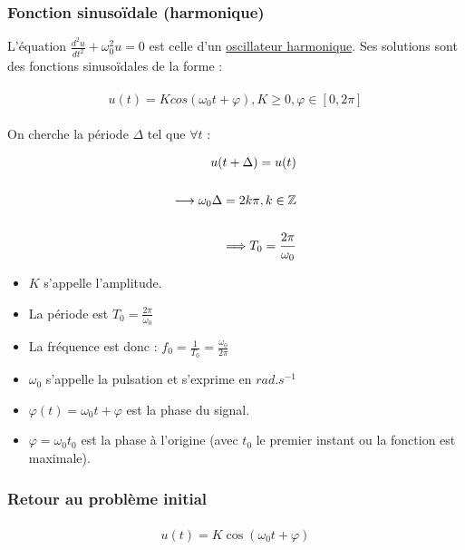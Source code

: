\documentclass{article}
\begin{document}
\subsubsection{Fonction sinusoïdale (harmonique)}

L'équation $\frac{d^2u}{dt^2}+\omega_0^2u=0$ est celle d'un \underline{oscillateur harmonique}. Ses solutions sont des fonctions sinusoïdales de la forme :

\begin{align*}\begin{split}
u(t)=Kcos(\omega_0t+\varphi), K\ge0, \varphi\in[0, 2\pi]
\end{split}\end{align*}

On cherche la période $\Delta$ tel que $\forall t$ :

\begin{align*}\begin{split}
u(t+\Delta)=u(t)\\\\
\longrightarrow \omega_0\Delta = 2k\pi, k\in\mathbb{Z}\\\\
\Longrightarrow T_0=\frac{2\pi}{\omega_0}
\end{split}\end{align*}

\begin{itemize}
    \item $K$ s'appelle l'amplitude.
    \item La période est $\boxed{T_0=\frac{2\pi}{\omega_0}}$
    \item La fréquence est donc : $\boxed{f_0=\frac{1}{T_0}=\frac{\omega_0}{2\pi}}$
    \item $\omega_0$ s'appelle la pulsation et s'exprime en $rad.s^{-1}$
    \item $\varphi(t)=\omega_0t+\varphi$ est la phase du signal.
    \item $\varphi=\omega_0t_0$ est la phase à l'origine (avec $t_0$ le premier instant ou la fonction est maximale).
\end{itemize}


\subsubsection{Retour au problème initial}

\begin{align*}\begin{split}
u(t)=K\cos(\omega_0t+\varphi)
\end{split}\end{align*}
\end{document}
